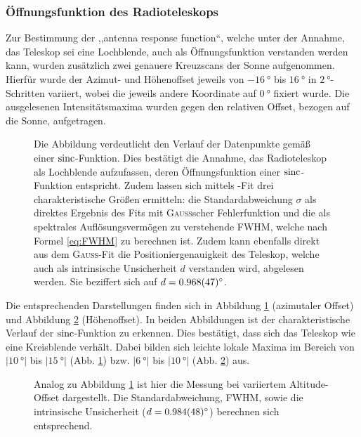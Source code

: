     \subsubsection{Öffnungsfunktion des Radioteleskops}
    Zur Bestimmung der ,,antenna response function``,
    welche unter der Annahme, das Teleskop sei eine Lochblende, auch als Öffnungsfunktion verstanden werden kann,
    wurden zusätzlich zwei genauere Kreuzscans der Sonne aufgenommen.
    Hierfür wurde der Azimut- und Höhenoffset jeweils von $\SI{-16}{\degree}$ bis $\SI{16}{\degree}$ in $\SI{2}{\degree}$-Schritten variiert, wobei die jeweils andere Koordinate auf $\SI{0}{\degree}$ fixiert wurde.
    Die ausgelesenen Intensitätsmaxima wurden gegen den relativen Offset, bezogen auf die Sonne, aufgetragen.
    \begin{figure}[H]
        \centering
        
        \caption[Kreuz-Scan der Sonne, Azimutaler Offset]{Die Abbildung verdeutlicht den Verlauf der Datenpunkte gemäß einer $\operatorname{sinc}$-Funktion. Dies bestätigt die Annahme, das Radioteleskop als Lochblende aufzufassen, deren Öffnungsfunktion einer $\operatorname{sinc}$-Funktion entspricht. Zudem lassen sich mittels -Fit drei charakteristische Größen ermitteln: die Standardabweichung $\sigma$ als direktes Ergebnis des Fits mit \textsc{Gauß}scher Fehlerfunktion und die als spektrales Auflösungsvermögen zu verstehende FWHM, welche nach Formel \eqref{eq:FWHM} zu berechnen ist. Zudem kann ebenfalls direkt aus dem \textsc{Gauß}-Fit die Positioniergenauigkeit des Teleskop, welche auch als intrinsische Unsicherheit $d$ verstanden wird, abgelesen werden. Sie beziffert sich auf $d = \SI{0.968 \pm 0.047}{\degree}$.}
        \label{fig:Sonnenkreuz_Az}
    \end{figure}
    Die entsprechenden Darstellungen finden sich in Abbildung \ref{fig:Sonnenkreuz_Az} (azimutaler Offset) und Abbildung \ref{fig:Sonnenkreuz_Alt} (Höhenoffset).
    In beiden Abbildungen ist der charakteristische Verlauf der $\operatorname{sinc}$-Funktion zu erkennen.
    Dies bestätigt, dass sich das Teleskop wie eine Kreisblende verhält.
    Dabei bilden sich leichte lokale Maxima im Bereich von $\vert\SI{10}{\degree}\vert$ bis $\vert\SI{15}{\degree}\vert$ (Abb. \ref{fig:Sonnenkreuz_Az}) bzw. $\vert\SI{6}{\degree}\vert$ bis $\vert\SI{10}{\degree}\vert$ (Abb. \ref{fig:Sonnenkreuz_Alt}) aus.
    \begin{figure}[H]
        \centering
        
        \caption[Kreuz-Scan der Sonne, Altitude Offset]{Analog zu Abbildung \ref{fig:Sonnenkreuz_Az} ist hier die Messung bei variiertem Altitude-Offset dargestellt. Die Standardabweichung, FWHM, sowie die intrinsische Unsicherheit ($d = \SI{0.984 \pm 0.048}{\degree}$) berechnen sich entsprechend.}
        \label{fig:Sonnenkreuz_Alt}
    \end{figure}
